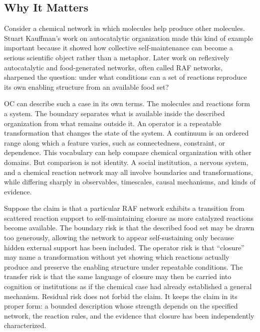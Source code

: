 \documentclass[11pt,a4paper,openany]{book}
\begin{document}
\subsection{Why It Matters}
Consider a chemical network in which molecules help produce other molecules. Stuart Kauffman's work on autocatalytic organization made this kind of example important because it showed how collective self-maintenance can become a serious scientific object rather than a metaphor. Later work on reflexively autocatalytic and food-generated networks, often called RAF networks, sharpened the question: under what conditions can a set of reactions reproduce its own enabling structure from an available food set? \cite{kauffman_autocatalytic,raf_networks}\par
OC can describe such a case in its own terms. The molecules and reactions form a system. The boundary separates what is available inside the described organization from what remains outside it. An operator is a repeatable transformation that changes the state of the system. A continuum is an ordered range along which a feature varies, such as connectedness, constraint, or dependence. This vocabulary can help compare chemical organization with other domains. But comparison is not identity. A social institution, a nervous system, and a chemical reaction network may all involve boundaries and transformations, while differing sharply in observables, timescales, causal mechanisms, and kinds of evidence.\par
Suppose the claim is that a particular RAF network exhibits a transition from scattered reaction support to self-maintaining closure as more catalyzed reactions become available. The boundary risk is that the described food set may be drawn too generously, allowing the network to appear self-sustaining only because hidden external support has been included. The operator risk is that ``closure'' may name a transformation without yet showing which reactions actually produce and preserve the enabling structure under repeatable conditions. The transfer risk is that the same language of closure may then be carried into cognition or institutions as if the chemical case had already established a general mechanism. Residual risk does not forbid the claim. It keeps the claim in its proper form: a bounded description whose strength depends on the specified network, the reaction rules, and the evidence that closure has been independently characterized.\par
\end{document}
